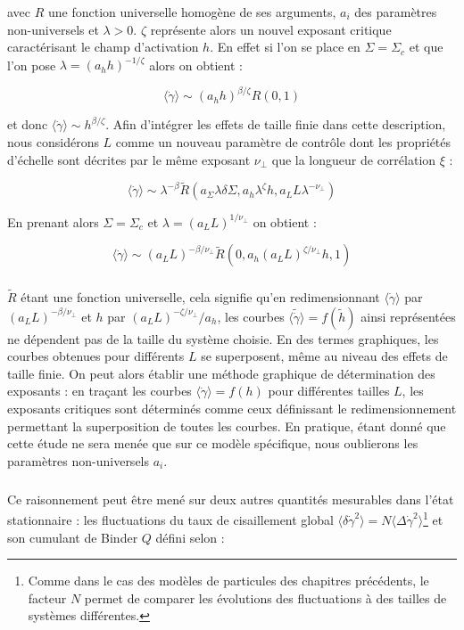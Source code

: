 \noindent avec $R$ une fonction universelle homogène de ses arguments, $a_i$ des paramètres non-universels et $\lambda > 0$. $\zeta$ représente alors un nouvel exposant critique caractérisant le champ d'activation $h$. En effet si l'on se place en $\Sigma = \Sigma_c$ et que l'on pose $\lambda=(a_h h)^{-1/\zeta}$ alors on obtient :

\begin{equation}
    \langle\dot{\gamma}\rangle \sim (a_h h)^{\beta/\zeta}R(0, 1)
\end{equation}

\noindent et donc $\langle\dot{\gamma}\rangle \sim  h^{\beta/\zeta}$. Afin d'intégrer les effets de taille finie dans cette description, nous considérons $L$ comme un nouveau paramètre de contrôle dont les propriétés d'échelle sont décrites par le même exposant $\nu_\perp$ que la longueur de corrélation $\xi$ :

\begin{equation}
    \langle\dot{\gamma}\rangle \sim \lambda^{-\beta}\tilde{R}(a_\Sigma \lambda\delta\Sigma,a_h\lambda^\zeta h, a_L L \lambda^{-\nu_\perp})
\end{equation}

\noindent En prenant alors $\Sigma=\Sigma_c$ et $\lambda=(a_LL)^{1/\nu_\perp}$ on obtient :

\begin{equation}
    \langle\dot{\gamma}\rangle \sim (a_LL)^{-\beta/\nu_\perp}\tilde{R}(0, a_h(a_LL)^{\zeta/\nu_\perp} h, 1)
\end{equation}

\subparagraph{}$\tilde{R}$ étant une fonction universelle, cela signifie qu'en redimensionnant $\langle\dot{\gamma}\rangle $ par $(a_LL)^{-\beta/\nu_\perp}$ et $h$ par $(a_LL)^{-\zeta/\nu_\perp}/a_h$, les courbes $\langle\tilde{\dot{\gamma}}\rangle = f(\tilde{h})$ ainsi représentées ne dépendent pas de la taille du système choisie. En des termes graphiques, les courbes obtenues pour différents $L$ se superposent, même au niveau des effets de taille finie. On peut alors établir une méthode graphique de détermination des exposants : en traçant les courbes $\langle \dot{\gamma} \rangle = f(h)$ pour différentes tailles $L$, les exposants critiques sont déterminés comme ceux définissant le redimensionnement permettant la superposition de toutes les courbes. En pratique, étant donné que cette étude ne sera menée que sur ce modèle spécifique, nous oublierons les paramètres non-universels $a_i$.

\subparagraph{}Ce raisonnement peut être mené sur deux autres quantités mesurables dans l'état stationnaire : les fluctuations du taux de cisaillement global $\langle\delta\dot{\gamma}^2\rangle = N\langle\Delta\dot{\gamma}^2\rangle$\footnote{Comme dans le cas des modèles de particules des chapitres précédents, le facteur $N$ permet de comparer les évolutions des fluctuations à des tailles de systèmes différentes.} et son cumulant de Binder $Q$ \cite{binder_finite_1981} défini selon :

